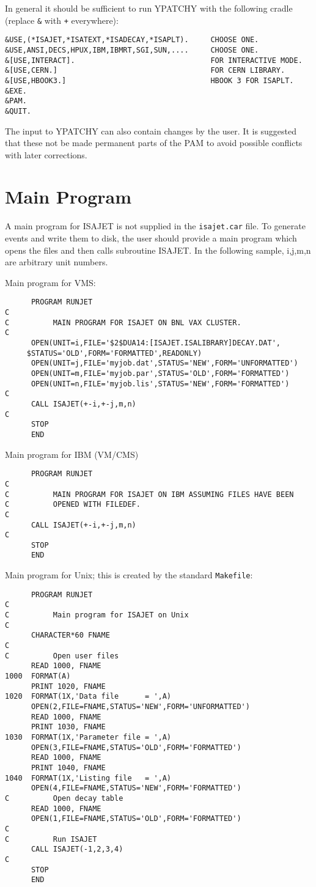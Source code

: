       In general it should be sufficient to run YPATCHY with the
following cradle (replace \verb|&| with \verb|+| everywhere):
\begin{verbatim}
&USE,(*ISAJET,*ISATEXT,*ISADECAY,*ISAPLT).     CHOOSE ONE.
&USE,ANSI,DECS,HPUX,IBM,IBMRT,SGI,SUN,....     CHOOSE ONE.
&[USE,INTERACT].                               FOR INTERACTIVE MODE.
&[USE,CERN.]                                   FOR CERN LIBRARY.
&[USE,HBOOK3.]                                 HBOOK 3 FOR ISAPLT.
&EXE.
&PAM.
&QUIT.
\end{verbatim}

      The input to YPATCHY can also contain changes by the user. It is
suggested that these not be made permanent parts of the PAM to avoid
possible conflicts with later corrections.
\newpage
\section{Main Program\label{MAIN}}

      A main program for ISAJET is not supplied in the \verb|isajet.car|
file. To generate events and write them to disk, the user should provide
a main program which opens the files and then calls subroutine ISAJET.
In the following sample, i,j,m,n are arbitrary unit numbers.

      Main program for VMS:
\begin{verbatim}
      PROGRAM RUNJET
C
C          MAIN PROGRAM FOR ISAJET ON BNL VAX CLUSTER.
C
      OPEN(UNIT=i,FILE='$2$DUA14:[ISAJET.ISALIBRARY]DECAY.DAT',
     $STATUS='OLD',FORM='FORMATTED',READONLY)
      OPEN(UNIT=j,FILE='myjob.dat',STATUS='NEW',FORM='UNFORMATTED')
      OPEN(UNIT=m,FILE='myjob.par',STATUS='OLD',FORM='FORMATTED')
      OPEN(UNIT=n,FILE='myjob.lis',STATUS='NEW',FORM='FORMATTED')
C
      CALL ISAJET(+-i,+-j,m,n)
C
      STOP
      END
\end{verbatim}

      Main program for IBM (VM/CMS)
\begin{verbatim}
      PROGRAM RUNJET
C
C          MAIN PROGRAM FOR ISAJET ON IBM ASSUMING FILES HAVE BEEN
C          OPENED WITH FILEDEF.
C
      CALL ISAJET(+-i,+-j,m,n)
C
      STOP
      END
\end{verbatim}

      Main program for Unix; this is created by the standard 
\verb|Makefile|:
\begin{verbatim}
      PROGRAM RUNJET
C
C          Main program for ISAJET on Unix
C
      CHARACTER*60 FNAME
C
C          Open user files
      READ 1000, FNAME
1000  FORMAT(A)
      PRINT 1020, FNAME
1020  FORMAT(1X,'Data file      = ',A)
      OPEN(2,FILE=FNAME,STATUS='NEW',FORM='UNFORMATTED')
      READ 1000, FNAME
      PRINT 1030, FNAME
1030  FORMAT(1X,'Parameter file = ',A)
      OPEN(3,FILE=FNAME,STATUS='OLD',FORM='FORMATTED')
      READ 1000, FNAME
      PRINT 1040, FNAME
1040  FORMAT(1X,'Listing file   = ',A)
      OPEN(4,FILE=FNAME,STATUS='NEW',FORM='FORMATTED')
C          Open decay table
      READ 1000, FNAME
      OPEN(1,FILE=FNAME,STATUS='OLD',FORM='FORMATTED')
C
C          Run ISAJET
      CALL ISAJET(-1,2,3,4)
C
      STOP
      END
\end{verbatim}


